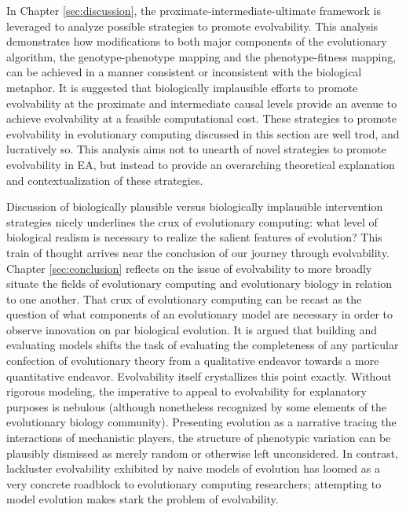 In Chapter \ref{sec:discussion}, the proximate-intermediate-ultimate framework is leveraged to analyze possible strategies to promote evolvability.
This analysis demonstrates how modifications to both major components of the evolutionary algorithm, the genotype-phenotype mapping and the phenotype-fitness mapping, can be achieved in a manner consistent or inconsistent with the biological metaphor.
It is suggested that biologically implausible efforts to promote evolvability at the proximate and intermediate causal levels provide an avenue to achieve evolvability at a feasible computational cost.
These strategies to promote evolvability in evolutionary computing discussed in this section are well trod, and lucratively so.
This analysis aims not to unearth of novel strategies to promote evolvability in EA, but instead to provide an overarching theoretical explanation and contextualization of these strategies.

Discussion of biologically plausible versus biologically implausible intervention strategies nicely underlines the crux of evolutionary computing: what level of biological realism is necessary to realize the salient features of evolution?
This train of thought arrives near the conclusion of our journey through evolvability.
Chapter \ref{sec:conclusion} reflects on the issue of evolvability to more broadly situate the fields of evolutionary computing and evolutionary biology in relation to one another.
That crux of evolutionary computing can be recast as the question of what components of an evolutionary model are necessary in order to observe innovation on par biological evolution.
It is argued that building and evaluating models shifts the task of evaluating the completeness of any particular confection of evolutionary theory from a qualitative endeavor towards a more quantitative endeavor.
Evolvability itself crystallizes this point exactly.
Without rigorous modeling, the imperative to appeal to evolvability for explanatory purposes is nebulous (although nonetheless recognized by some elements of the evolutionary biology community).
Presenting evolution as a narrative tracing the interactions of mechanistic players, the structure of phenotypic variation can be plausibly dismissed as merely random or otherwise left unconsidered.
In contrast, lackluster evolvability exhibited by naive models of evolution has loomed as a very concrete roadblock to evolutionary computing researchers; attempting to model evolution makes stark the problem of evolvability.

